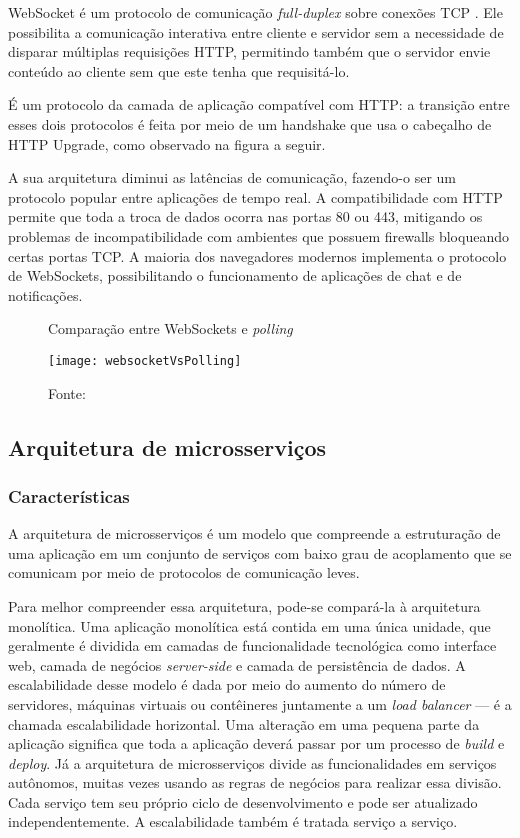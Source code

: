 WebSocket é um protocolo de comunicação \emph{full-duplex} sobre conexões TCP \cite{rfc6455}. Ele possibilita a comunicação interativa entre cliente e servidor sem a necessidade de disparar múltiplas requisições HTTP, permitindo também que o servidor envie conteúdo ao cliente sem que este tenha que requisitá-lo.

É um protocolo da camada de aplicação compatível com HTTP: a transição entre esses dois protocolos é feita por meio de um handshake que usa o cabeçalho de HTTP Upgrade, como observado na figura a seguir.

A sua arquitetura diminui as latências de comunicação, fazendo-o ser um protocolo popular entre aplicações de tempo real. A compatibilidade com HTTP permite que toda a troca de dados ocorra nas portas 80 ou 443, mitigando os problemas de incompatibilidade com ambientes que possuem firewalls bloqueando certas portas TCP. A maioria dos navegadores modernos implementa o protocolo de WebSockets, possibilitando o funcionamento de aplicações de chat e de notificações.

\begin{figure}[H]
	\centering
	\caption{Comparação entre WebSockets e \emph{polling}}
  \texttt{[image: websocketVsPolling]}
	\caption*{Fonte: \cite{lubbers}}
\label{fig:websocketVsPolling}
\end{figure}

\subsection{Arquitetura de microsserviços}

\subsubsection{Características}
A arquitetura de microsserviços é um modelo que compreende a estruturação de uma aplicação em um conjunto de serviços com baixo grau de acoplamento que se comunicam por meio de protocolos de comunicação leves.

Para melhor compreender essa arquitetura, pode-se compará-la à arquitetura monolítica. Uma aplicação monolítica está contida em uma única unidade, que geralmente é dividida em camadas de funcionalidade tecnológica como interface web, camada de negócios \emph{server-side} e camada de persistência de dados. A escalabilidade desse modelo é dada por meio do aumento do número de servidores, máquinas virtuais ou contêineres juntamente a um \emph{load balancer} --- é a chamada escalabilidade horizontal. Uma alteração em uma pequena parte da aplicação significa que toda a aplicação deverá passar por um processo de \textit{build} e \textit{deploy}. Já a arquitetura de microsserviços divide as funcionalidades em serviços autônomos, muitas vezes usando as regras de negócios para realizar essa divisão. Cada serviço tem seu próprio ciclo de desenvolvimento e pode ser atualizado independentemente. A escalabilidade também é tratada serviço a serviço.

